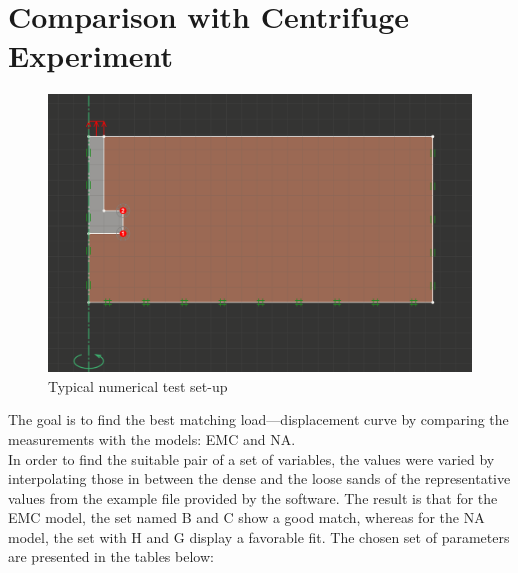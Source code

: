\documentclass[a4paper, nobind]{templates/ociamthesis}
\begin{document}
\hypertarget{comparison-with-centrifuge-experiment}{%
\chapter{Comparison with Centrifuge Experiment}\label{comparison-with-centrifuge-experiment}}

\begin{figure}[H]
\includegraphics[width=1\linewidth]{myfigureeeeee/numericaltestsetup} \caption{Typical numerical test set-up}\label{fig:unnamed-chunk-34}
\end{figure}

The goal is to find the best matching load---displacement curve by comparing the measurements with the models: EMC and NA.\\
In order to find the suitable pair of a set of variables, the values were varied by interpolating those in between the dense and the loose sands of the representative values from the example file provided by the software. The result is that for the EMC model, the set named B and C show a good match, whereas for the NA model, the set with H and G display a favorable fit. The chosen set of parameters are presented in the tables below:
\end{document}
